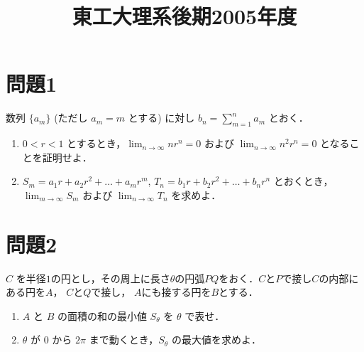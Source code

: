 \documentclass[unicode,12pt, a4paper]{ltjsarticle}%
\title{東工大理系後期2005年度}
\begin{document}
\maketitle
\section{問題1}
数列 $\{a_m\}$ (ただし $a_m = m$ とする) に対し $b_n = \sum_{m=1}^{n} a_m$ とおく．
    \begin{enumerate}
        \item $0 < r < 1$ とするとき，$\lim_{n \to \infty} nr^n = 0$ および $\lim_{n \to \infty} n^2r^n = 0$ となることを証明せよ．
        \item $S_m = a_1r + a_2r^2 + \dots + a_mr^m$, $T_n = b_1r + b_2r^2 + \dots + b_nr^n$ とおくとき，
        $\lim_{m \to \infty} S_m$ および $\lim_{n \to \infty} T_n$ を求めよ．
    \end{enumerate}


\section{問題2}
$C$ を半径$1$の円とし，その周上に長さ$\theta$の円弧$PQ$をおく．$C$と$P$で接し$C$の内部にある円を$A$， $C$と$Q$で接し， $A$にも接する円を$B$とする．
    \begin{enumerate}
        \item $A$ と $B$ の面積の和の最小値 $S_\theta$ を $\theta$ で表せ．
        \item $\theta$ が $0$ から $2\pi$ まで動くとき，$S_\theta$ の最大値を求めよ．
    \end{enumerate}
\end{document}
